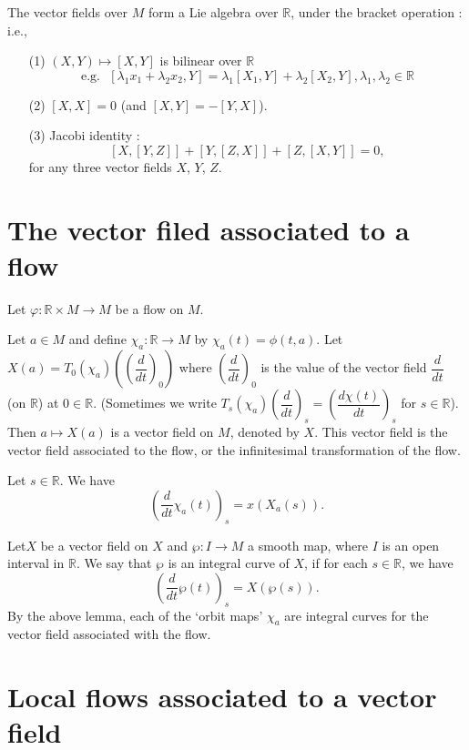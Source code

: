 The vector fields over $M$ form a Lie algebra over $\mathbb{R}$, under the bracket operation : i.e.,
\begin{itemize}
\item[(1)] $(X,Y)\mapsto [X,Y]$ is bilinear over $\mathbb{R}$
$$
\text{e.g.~ } [\lambda_{1}x_{1}+\lambda_{2}x_{2},Y]=\lambda_{1}[X_{1},Y]+\lambda_{2}[X_{2},Y],\lambda_{1},\lambda_{2}\in \mathbb{R}
$$

\item[(2)] $[X,X]=0$ (and $[X,Y]=-[Y,X]$).

\item[(3)] Jacobi identity :
$$
[X,[Y,Z]]+[Y,[Z,X]]+[Z,[X,Y]]=0,
$$
for any three vector fields $X$, $Y$, $Z$.
\end{itemize}

\section*{The vector filed associated to a flow}

Let $\varphi:\mathbb{R}\times M\to M$ be a flow on $M$.

Let $a\in M$ and define $\chi_{a}:\mathbb{R}\to M$ by $\chi_{a}(t)=\phi(t,a)$. Let $X(a)=T_{0}(\chi_{a})\left(\left(\dfrac{d}{dt}\right)_{0}\right)$ where $\left(\dfrac{d}{dt}\right)_{0}$ is the value of the vector field $\dfrac{d}{dt}$ (on $\mathbb{R}$) at $0\in \mathbb{R}$. (Sometimes we write $T_{s}(\chi_{a})\left(\dfrac{d}{dt}\right)_{s}=\left(\dfrac{d\chi(t)}{dt}\right)_{s}$ for $s\in \mathbb{R}$). Then $a\mapsto X(a)$ is a vector field on $M$, denoted by $X$. This vector field is the vector field associated to the flow, or the infinitesimal transformation of the flow.

\begin{lemma}\label{chap6-lem6.1}
Let $s\in \mathbb{R}$. We have
$$
\left(\dfrac{d}{dt}\chi_{a}(t)\right)_{s}=x(X_{a}(s)).
$$
\end{lemma}

Let\pageoriginale $X$ be a vector field on $X$ and $\wp : I\to M$ a smooth map, where $I$ is an open interval in $\mathbb{R}$. We say that $\wp$ is an integral curve of $X$, if for each $s\in \mathbb{R}$, we have
$$
\left(\dfrac{d}{dt}\wp (t)\right)_{s}=X(\wp(s)).
$$
By the above lemma, each of the `orbit maps' $\chi_{a}$ are integral curves for the vector field associated with the flow.

\section*{Local flows associated to a vector field}

